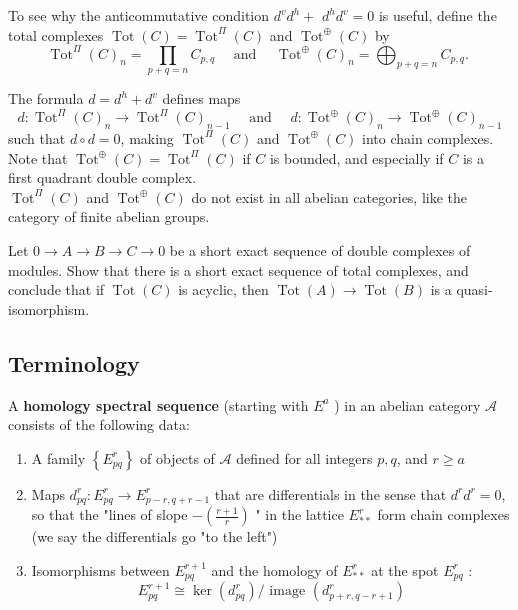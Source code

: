 \begin{example}
To see why the anticommutative condition $d^v d^h+$ $d^h d^v=0$ is useful, define the total complexes $\operatorname{Tot}(C)=\operatorname{Tot}^{\Pi}(C)$ and $\operatorname{Tot}^{\oplus}(C)$ by
$$
\operatorname{Tot}^{\Pi}(C)_n=\prod_{p+q=n} C_{p, q} \quad \text { and } \quad \operatorname{Tot}^{\oplus}(C)_n=\bigoplus_{p+q=n} C_{p, q} \text {. }
$$

The formula $d=d^h+d^v$ defines maps
$$
d: \operatorname{Tot}^{\Pi}(C)_n \rightarrow \operatorname{Tot}^{\Pi}(C)_{n-1} \quad \text { and } \quad d: \operatorname{Tot}^{\oplus}(C)_n \rightarrow \operatorname{Tot}^{\oplus}(C)_{n-1}
$$
such that $d \circ d=0$, making $\operatorname{Tot}^{\Pi}(C)$ and $\operatorname{Tot}^{\oplus}(C)$ into chain complexes. Note that $\operatorname{Tot}^{\oplus}(C)=\operatorname{Tot}^{\Pi}(C)$ if $C$ is bounded, and especially if $C$ is a first quadrant double complex.\\ $\operatorname{Tot}^{\Pi}(C)$ and $\operatorname{Tot}^{\oplus}(C)$ do not exist in all abelian categories, like the category of finite abelian groups.

\begin{prop}
Let $0 \rightarrow A \rightarrow B \rightarrow C \rightarrow 0$ be a short exact sequence of double complexes of modules. Show that there is a short exact sequence of total complexes, and conclude that if $\operatorname{Tot}(C)$ is acyclic, then $\operatorname{Tot}(A) \rightarrow \operatorname{Tot}(B)$ is a quasi-isomorphism.
\end{prop}

\subsection{Terminology}

A \textbf{homology spectral sequence } (starting with $E^a$ ) in an abelian category $\mathcal{A}$ consists of the following data:
\begin{enumerate}
    \item 
    A family $\left\{E_{p q}^r\right\}$ of objects of $\mathcal{A}$ defined for all integers $p, q$, and $r \geq a$
    \item 
    Maps $d_{p q}^r: E_{p q}^r \rightarrow E_{p-r, q+r-1}^r$ that are differentials in the sense that $d^r d^r=0$, so that the "lines of slope $ \displaystyle - \left(\frac{r+1}{r}\right)$ " in the lattice $E_{* *}^r$ form chain complexes (we say the differentials go "to the left")
    \item 
    Isomorphisms between $E_{p q}^{r+1}$ and the homology of $E_{* *}^r$ at the spot $E_{p q}^r$ :
    $$
    E_{p q}^{r+1} \cong \operatorname{ker}\left(d_{p q}^r\right) / \text { image }\left(d_{p+r, q-r+1}^r\right)
    $$
\end{enumerate}


\end{example}
